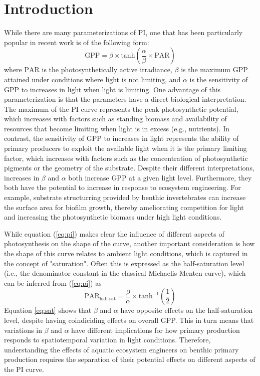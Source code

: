 \section*{Introduction}

While there are many parameterizations of PI, 
one that has been particularly popular in recent work is of the following form:
%
\begin{equation} \label{eq:pi}
  \text{GPP} = 
    \beta \times \text{tanh}\left(\frac{\alpha} {\beta} \times \text{PAR}\right)
\end{equation}
%
where $\text{PAR}$ is the photosynthetically active irradiance,
$\beta$ is the maximum GPP attained under conditions where light is not limiting,
and $\alpha$ is the sensitivity of GPP to increases in light when light is limiting.
One advantage of this parameterization is that the parameters have a direct 
biological interpretation. 
The maximum of the PI curve represents the peak photosynthetic potential,
which increases with factors such as standing biomass and
availability of resources that become limiting when light is in excess (e.g., nutrients).
In contrast, the sensitivity of GPP to increases in light represents the ability 
of primary producers to exploit the available light when it is the primary limiting factor,
which increases with factors such as the concentration of photosynthetic pigments or the 
geometry of the substrate.
Despite their different interpretations, increases in $\beta$ and $\alpha$ both increase
GPP at a given light level.
Furthermore, they both have the potential to increase in response to 
ecosystem engineering.
For example, substrate structurring provided by benthic invertebrates can increase
the surface area for biofilm growth, 
thereby ameliorating competition for light and increasing the photosynthetic 
biomass under high light conditions.

While equation (\ref{eq:pi}) makes clear the influence of different aspects of photosynthesis
on the shape of the curve, 
another important consideration is how the shape of this curve relates to ambient light
conditions, which is captured in the concept of "saturation". 
Often this is expressed as the half-saturation level 
(i.e., the denominator constant in the classical Michaelis-Menten curve), 
which can be inferred from (\ref{eq:pi}) as
%
\begin{equation} \label{eq:sat}
  \text{PAR}_{\text{half~sat}} = 
    \frac{\beta} {\alpha} \times \text{tanh}^{-1} \left(\frac{1}{2}\right)
\end{equation}
%
Equation \ref{eq:sat} shows that $\beta$ and $\alpha$ have opposite effects on the 
half-saturation level, 
despite having coindiciding effects on overall GPP.
This in turn means that variations in $\beta$ and $\alpha$ have 
different implications for how primary production responds to spatiotemporal variation 
in light conditions.
Therefore,
understanding the effects of aquatic ecosystem engineers on benthic primary production
requires the separation of their potential effects on different aspects of the PI curve.

